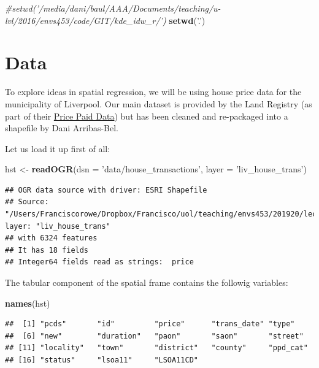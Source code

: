 \documentclass[]{book}
\newenvironment{Shaded}{\begin{snugshade}}{\end{snugshade}}
\newcommand{\KeywordTok}[1]{\textcolor[rgb]{0.13,0.29,0.53}{\textbf{#1}}}
\newcommand{\DataTypeTok}[1]{\textcolor[rgb]{0.13,0.29,0.53}{#1}}
\newcommand{\StringTok}[1]{\textcolor[rgb]{0.31,0.60,0.02}{#1}}
\newcommand{\CommentTok}[1]{\textcolor[rgb]{0.56,0.35,0.01}{\textit{#1}}}
\newcommand{\NormalTok}[1]{#1}
\begin{document}
\begin{Shaded}
\begin{Highlighting}[]
\CommentTok{#setwd('/media/dani/baul/AAA/Documents/teaching/u-lvl/2016/envs453/code/GIT/kde_idw_r/')}
\KeywordTok{setwd}\NormalTok{(}\StringTok{'.'}\NormalTok{)}
\end{Highlighting}
\end{Shaded}

\section{Data}\label{data-2}

To explore ideas in spatial regression, we will be using house price
data for the municipality of Liverpool. Our main dataset is provided by
the Land Registry (as part of their
\href{https://www.gov.uk/government/collections/price-paid-data}{Price
Paid Data}) but has been cleaned and re-packaged into a shapefile by
Dani Arribas-Bel.

Let us load it up first of all:

\begin{Shaded}
\begin{Highlighting}[]
\NormalTok{hst <-}\StringTok{ }\KeywordTok{readOGR}\NormalTok{(}\DataTypeTok{dsn =} \StringTok{'data/house_transactions'}\NormalTok{, }\DataTypeTok{layer =} \StringTok{'liv_house_trans'}\NormalTok{)}
\end{Highlighting}
\end{Shaded}

\begin{verbatim}
## OGR data source with driver: ESRI Shapefile 
## Source: "/Users/Franciscorowe/Dropbox/Francisco/uol/teaching/envs453/201920/lectures/san/data/house_transactions", layer: "liv_house_trans"
## with 6324 features
## It has 18 fields
## Integer64 fields read as strings:  price
\end{verbatim}

The tabular component of the spatial frame contains the followig
variables:

\begin{Shaded}
\begin{Highlighting}[]
\KeywordTok{names}\NormalTok{(hst)}
\end{Highlighting}
\end{Shaded}

\begin{verbatim}
##  [1] "pcds"       "id"         "price"      "trans_date" "type"      
##  [6] "new"        "duration"   "paon"       "saon"       "street"    
## [11] "locality"   "town"       "district"   "county"     "ppd_cat"   
## [16] "status"     "lsoa11"     "LSOA11CD"
\end{verbatim}
\end{document}
